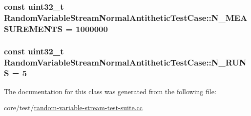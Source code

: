 \subsubsection[{\texorpdfstring{N\+\_\+\+M\+E\+A\+S\+U\+R\+E\+M\+E\+N\+TS}{N_MEASUREMENTS}}]{\setlength{\rightskip}{0pt plus 5cm}const uint32\+\_\+t Random\+Variable\+Stream\+Normal\+Antithetic\+Test\+Case\+::\+N\+\_\+\+M\+E\+A\+S\+U\+R\+E\+M\+E\+N\+TS = 1000000\hspace{0.3cm}{\ttfamily [static]}}\hypertarget{classRandomVariableStreamNormalAntitheticTestCase_a2af883acc639d6f19843c57a174c0349}{}\label{classRandomVariableStreamNormalAntitheticTestCase_a2af883acc639d6f19843c57a174c0349}
\subsubsection[{\texorpdfstring{N\+\_\+\+R\+U\+NS}{N_RUNS}}]{\setlength{\rightskip}{0pt plus 5cm}const uint32\+\_\+t Random\+Variable\+Stream\+Normal\+Antithetic\+Test\+Case\+::\+N\+\_\+\+R\+U\+NS = 5\hspace{0.3cm}{\ttfamily [static]}}\hypertarget{classRandomVariableStreamNormalAntitheticTestCase_aad75ff2556c09a7dfb5e08546b25fac4}{}\label{classRandomVariableStreamNormalAntitheticTestCase_aad75ff2556c09a7dfb5e08546b25fac4}


The documentation for this class was generated from the following file\+:\begin{DoxyCompactItemize}
\item 
core/test/\hyperlink{random-variable-stream-test-suite_8cc}{random-\/variable-\/stream-\/test-\/suite.\+cc}\end{DoxyCompactItemize}
